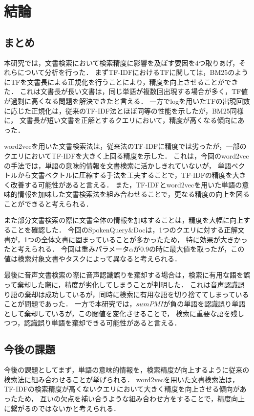 
\chapter{結論} 
\section{まとめ}
本研究では，文書検索において検索精度に影響を及ぼす要因を4つ取りあげ，それらについて分析を行った．
まずTF-IDFにおけるTFに関しては，BM25のようにTFを文書長による正規化を行うことにより，精度を向上させることができた．
これは文書長が長い文書は，同じ単語が複数回出現する場合が多く，TF値が過剰に高くなる問題を解決できたと言える．
一方でlogを用いたTFの出現回数に応じた正規化は，従来のTF-IDF法とほぼ同等の性能を示したが，BM25同様に，
文書長が短い文書を正解とするクエリにおいて，精度が高くなる傾向にあった．

word2vecを用いた文書検索法は，従来法のTF-IDFに精度では劣ったが，一部のクエリにおいてTF-IDFを大きく上回る精度を示した．
これは，今回のword2vecの手法では，単語の意味的情報を文書検索に活かしきれていないが，
単語ベクトルから文書ベクトルに圧縮する手法を工夫することで，TF-IDFの精度を大きく改善する可能性があると言える．
また，TF-IDFとword2vecを用いた単語の意味的情報を加味した文書検索法を組み合わせることで，更なる精度の向上を図ることができると考えられる．

また部分文書検索の際に文書全体の情報を加味することは，精度を大幅に向上することを確認した．
今回のSpokenQuery\&Docは，1つのクエリに対する正解文書が，1つの全体文書に固まっていることが多かったため，
特に効果が大きかったと考えられる．
今回は重みパラメータ$\alpha$が0.9の時に最大値を取ったが，この値は検索対象文書やタスクによって異なると考えられる．

最後に音声文書検索の際に音声認識誤りを棄却する場合は，検索に有用な語を誤って棄却した際に，精度が劣化してしまうことが判明した．
これは音声認識誤り語の棄却は成功しているが，同時に検索に有用な語を切り捨ててしまっていることが問題であった．
一方で本研究では，$sumPMI$が負の単語を認識誤り単語として棄却しているが，この閾値を変化させることで，
検索に重要な語を残しつつ，認識誤り単語を棄却できる可能性があると言える．

\section{今後の課題}
今後の課題としてまず，単語の意味的情報を，検索精度が向上するように従来の検索法に組み合わせることが挙げられる．
word2vecを用いた文書検索法は，TF-IDFの検索精度が高くないクエリにおいて大きく精度を向上させる傾向があったため，
互いの欠点を補い合うような組み合わせ方をすることで，精度向上に繋がるのではないかと考えられる．


